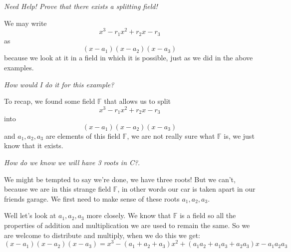 \documentclass[12pt]{article}
\begin{document}
\emph{Need Help! Prove that there exists a splitting field!}


We may write $$x^3 -r_1 x^2 +r_2 x - r_3$$ as $$(x-a_1)(x-a_2)(x-a_3)$$  because we look at it in a field in which it is possible, just as we did in the above examples. 

\emph{How would I do it for this example?} 




To recap, we found some field $\mathbb{F}$ that allows us to split $$x^3 -r_1 x^2 +r_2 x - r_3$$ into $$(x-a_1)(x-a_2)(x-a_3)$$ and $a_1, a_2, a_3$ are elements of this field $\mathbb{F}$, we are not really sure what $\mathbb{F}$ is, we just know that it exists.

\emph{How do we know we will have 3 roots in C?}.

We might be tempted to say we're done, we have three roots!  But we can't, because we are in this strange field $\mathbb{F}$, in other words our car is taken apart in our friends garage.  We first need to make sense of these roots $a_1, a_2, a_3$.


Well let's look at $a_1, a_2, a_3$ more closely.  We know that $\mathbb{F}$ is a field so all the properties of addition and multiplication we are used to remain the same.  So we are welcome to distribute and multiply, when we do this we get:
$$ (x-a_1)(x-a_2)(x-a_3) = x^3 -(a_1+a_2+a_3)x^2+(a_1a_2 +a_1a_3 +a_2a_3)x -a_1a_2a_3$$
\end{document}
